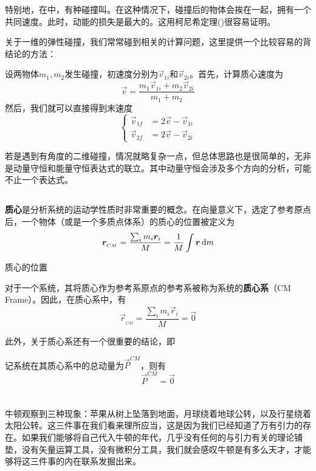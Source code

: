 特别地，在中，有种碰撞叫。在这种情况下，碰撞后的物体会挨在一起，拥有一个共同速度。此时，动能的损失是最大的。这用柯尼希定理()很容易证明。

关于一维的弹性碰撞，我们常常碰到相关的计算问题，这里提供一个比较容易的背结论的方法：

设两物体$m_{1},m_{2}$发生碰撞，初速度分别为$\vec{v}_{1i}$和$\vec{v}_{2i}$。首先，计算质心速度为
\[\vec{v}=\frac{m_{1}\vec{v}_{1i}+m_{2}\vec{v}_{2i}}{m_{1}+m_{2}}\]
然后，我们就可以直接得到末速度
\[\left\{\begin{aligned}
	\vec{v}_{1f}&=2\vec{v}-\vec{v}_{1i}\\
	\vec{v}_{2f}&=2\vec{v}-\vec{v}_{2i}
\end{aligned}\right.\]

若是遇到有角度的二维碰撞，情况就略复杂一点，但总体思路也是很简单的，无非是动量守恒和能量守恒表达式的联立。其中动量守恒会涉及多个方向的分析，可能不止一个表达式。

\subsection[质心系中的碰撞]{}
\textbf{质心}是分析系统的运动学性质时非常重要的概念。在向量意义下，选定了参考原点后，一个物体（或是一个多质点体系）的质心的位置被定义为
\[\vec{r}_{_{CM}}=\frac{\sum_{i}^{}m_{i}\vec{r}_{i}}{M}=\frac{1}{M}\int \vec{r}\dif m\]

\begin{center}
	质心的位置
\end{center}

对于一个系统，其将质心作为参考系原点的参考系被称为系统的\textbf{质心系}（CM Frame）。因此，在质心系中，有
\[\vec{r}_{_{CM}}=\frac{\sum_{i}^{}m_{i}\vec{r}_{i}}{M}=\vec{0}\]

此外，关于质心系还有一个很重要的结论，即
\begin{law}
	记系统在其质心系中的总动量为$\vec{P}^{CM}$，则有
	\[\vec{P}^{CM}=\vec{0}\]
\end{law}

\section[重力]{}
\subsection[牛顿万有引力定律]{}
牛顿观察到三种现象：苹果从树上坠落到地面，月球绕着地球公转，以及行星绕着太阳公转。这三件事在我们看来理所应当，这是因为我们已经知道了万有引力的存在。如果我们能够将自己代入牛顿的年代，几乎没有任何的与引力有关的理论铺垫，没有矢量运算工具，没有微积分工具，我们就会感叹牛顿是有多么天才，才能够将这三件事的内在联系发掘出来。

